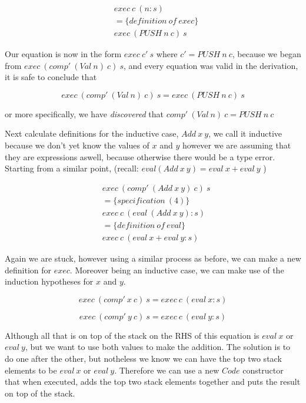 \documentclass {article}
\begin{document}
\begin{align*}
	&exec \ c \ (n:s) \\
	&= \{definition \ of \ exec\} \\
	&exec \ (PUSH \ n \ c) \ s
\end{align*}

Our equation is now in the form $exec \ c' \ s$
where $c' = PUSH \ n \ c$, 
because we began from 
\(exec \ (comp' \ (Val \ n) \ c) \ s \),
and every equation was valid in the derivation,
it is safe to conclude that 

\[exec \ (comp' \ (Val \ n) \ c) \ s = exec \ (PUSH \ n \ c) \ s\]

or more specifically, we have \emph{discovered} that 
 \( comp' \ (Val \ n) \ c =  PUSH \ n \ c \)

Next \BH calculate definitions for the inductive case, 
$Add \ x \ y$,
we call it inductive because we don't yet know 
the values of $x$ and $y$ however we are assuming
that they are expressions aswell,
because otherwise there would be a type error.
Starting from a similar point,
(recall: \( eval (Add \  x \  y) = eval \  x + eval \  y  \) )

\begin{align*}
	&exec \ (comp' \ (Add \ x \ y) \ c) \ s \\
	&= \{specification \ (4) \} \\
	&exec \ c \ (eval \ (Add \ x \ y) : s) \\
	&= \{definition \ of \ eval\} \\
	&exec \ c \ (eval \ x + eval \ y :s)
\end{align*}

Again we are stuck, however using a similar process
as before, we can make a new definition for $exec$.
Moreover being an inductive case, 
we can make use of the induction 
hypotheses for $x$ and $y$\cite{bandh}.

\[exec \ (comp' \ x \ c) \ s = exec \ c \ (eval \ x:s) \]

\[exec \ (comp' \ y \ c) \ s = exec \ c \ (eval \ y:s) \]

Although all that is on top of the stack on the
RHS of this equation is $eval \ x$ or $eval \ y$,
but we want to use both values to make the addition.
The solution is to do one after the other,
but notheless we know we can have the top two 
stack elements to be $eval \ x$ or $eval \ y$.
Therefore we can use a new $Code$ constructor
that when executed, adds the top two stack elements
together and puts the result on top of the stack.
\end{document}
